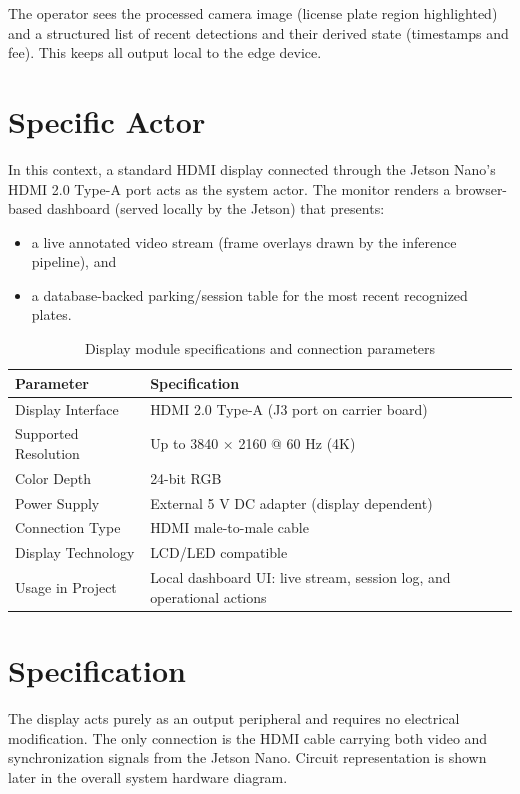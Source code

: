 The operator sees the processed camera image (license plate region highlighted) and a structured list of recent detections and their derived state (timestamps and fee).
This keeps all output local to the edge device.

\section{Specific Actor}
\label{sec:display_specs}
In this context, a standard \ac{HDMI} display connected through the Jetson Nano’s \ac{HDMI} 2.0 Type-A port acts as the system actor.
The monitor renders a browser-based dashboard (served locally by the Jetson) that presents:
\begin{itemize}
	\item a live annotated video stream (frame overlays drawn by the inference pipeline), and
	\item a database-backed parking/session table for the most recent recognized plates.
\end{itemize}

\begin{table}[H]
	\centering
	\caption{Display module specifications and connection parameters \cite{seeedJ101Manual, jetson_nano_doc}}
	\label{tab:display_specs}
	\begin{tabular}{|p{5cm}|p{8cm}|}
		\hline
		\textbf{Parameter} & \textbf{Specification} \\ \hline
		Display Interface & \ac{HDMI} 2.0 Type-A (J3 port on carrier board) \\ \hline
		Supported Resolution & Up to 3840 × 2160 @ 60 Hz (4K) \\ \hline
		Color Depth & 24-bit RGB \\ \hline
		Power Supply & External 5 V DC adapter (display dependent) \\ \hline
		Connection Type & \ac{HDMI} male-to-male cable \\ \hline
		Display Technology & LCD/LED compatible \\ \hline
		Usage in Project & Local dashboard UI: live stream, session log, and operational actions \\ \hline
	\end{tabular}
\end{table}

\section{Specification}
The display acts purely as an output peripheral and requires no electrical modification.  
The only connection is the \ac{HDMI} cable carrying both video and synchronization signals from the Jetson Nano.  
Circuit representation is shown later in the overall system hardware diagram.

